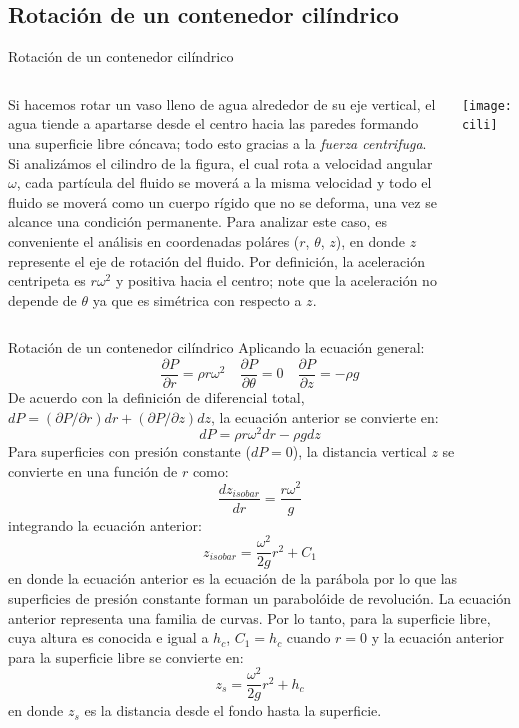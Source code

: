 \documentclass [xcolor=svgnames, t] {beamer}
\begin{document}
\subsection{Rotaci\'on de un contenedor cil\'indrico}
\begin{frame}{Rotaci\'on de un contenedor cil\'indrico}
\vspace{-0.4cm}
\small
\begin{columns}
Si hacemos rotar un vaso lleno de agua alrededor de su eje vertical, el agua tiende a apartarse desde el centro hacia las paredes formando una superficie libre c\'oncava; todo esto gracias a la \emph{fuerza centrifuga}. Si analiz\'amos el cilindro de la figura, el cual rota a velocidad angular $\omega$,  cada part\'icula del fluido se mover\'a a la misma velocidad y todo el fluido se mover\'a como un cuerpo r\'igido que no se deforma, una vez se alcance una condici\'on permanente. Para analizar este caso, es conveniente el an\'alisis en coordenadas pol\'ares ($r$, $\theta$, $z$), en donde $z$ represente el eje de rotaci\'on del fluido. Por definici\'on, la aceleraci\'on centripeta es $r \omega^2$ y positiva hacia el centro; note que la aceleraci\'on no depende de $\theta$ ya que es sim\'etrica con respecto a $z$. 
\vspace{-0.4cm}
\begin{center}
\texttt{[image: cili]}
\end{center}
\end{columns}
\end{frame}

\begin{frame}{Rotaci\'on de un contenedor cil\'indrico}
\vspace{-0.4cm}
\footnotesize
Aplicando la ecuaci\'on general:
$$
\frac{\partial P}{\partial r} = \rho r \omega^2 \quad \frac{\partial P}{\partial \theta} = 0 \quad \frac{\partial P}{\partial z} = -\rho g
$$
De acuerdo con la definici\'on de diferencial total, $dP = (\partial P / \partial r)dr + (\partial P / \partial z)dz$, la ecuaci\'on anterior se convierte en:
$$
dP = \rho r \omega^2 dr - \rho g dz
$$
Para superficies con presi\'on constante ($dP = 0$), la distancia vertical $z$ se convierte en una funci\'on de $r$ como:
$$
\frac{d z_{isobar}}{dr} = \frac{r \omega^2}{g}
$$
integrando la ecuaci\'on anterior:
\vspace{-0.4cm}
$$
z_{isobar} = \frac{\omega^2}{2g} r^2 + C_1
$$
en donde la ecuaci\'on anterior es la ecuaci\'on de la par\'abola por lo que las superficies de presi\'on constante forman un parabol\'oide de revoluci\'on. La ecuaci\'on anterior representa una familia de curvas. Por lo tanto, para la superficie libre, cuya altura es conocida e igual a $h_c$, $C_1=h_c$ cuando $r=0$ y la ecuaci\'on anterior para la superficie libre se convierte en:
\vspace{-0.3cm}
$$
z_s = \frac{\omega^2}{2g} r^2 + h_c
$$
en donde $z_s$ es la distancia desde el fondo hasta la superficie. 
\end{frame}
\end{document}
